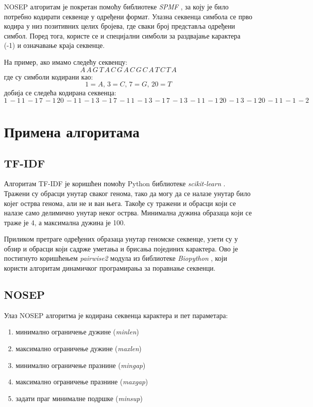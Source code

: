 \documentclass[12pt]{article}
\begin{document}
NOSEP алгоритам је покретан помоћу библиотеке \textit{SPMF} \cite{fournierviger2016spmf}, за коју је било потребно кодирати секвенце у одређени формат. Улазна секвенца симбола се прво кодира у низ позитивних целих бројева, где сваки број представља одређени симбол. Поред тога, користе се и специјални симболи за раздвајање карактера (-1) и означавање краја секвенце.

На пример, ако имамо следећу секвенцу:
$$ A\,  A\, G\, T\, A\, C\, G\, A\, C\, G\, C\, A\, T\, C\, T\, A  $$
где су симболи кодирани као:
$$ 1 = A,\, 3 = C,\, 7 = G,\, 20 = T $$
добија се следећа кодирана секвенца:
$$ 1\, -1\, 1\, -1\, 7\, -1\, 20\, -1\, 1\, -1\, 3\, -1\, 7\, -1\, 1\, -1\, 3\, -1\, 7\, -1\, 3\, -1\, 1\, -1\, 20\, -1\, 3\, -1\, 20\, -1\, 1\, -1\, -2\, $$


\section{Примена алгоритама}

\subsection{TF-IDF}
Алгоритам TF-IDF је коришћен помоћу Python библиотеке \textit{scikit-learn} \cite{scikit-learn}. Тражени су обрасци унутар сваког генома, тако да могу да се налазе унутар било којег острва генома, али не и ван њега. Такође су тражени и обрасци који се налазе само делимично унутар неког острва. Минимална дужина образаца који се траже је 4, а максимална дужина је 100.

Приликом претраге одређених образаца унутар геномске секвенце, узети су у обзир и обрасци који садрже уметања и брисања појединих карактера. Ово је постигнуто коришћењем \textit{pairwise2} модула из библиотеке \textit{Biopython} \cite{cock2009biopython}, који користи алгоритам динамичког програмирања за поравнање секвенци.

\subsection{NOSEP}

Улаз NOSEP алгоритма је кодирана секвенца карактера и пет параметара:
\begin{enumerate}
 \item минимално ограничење дужине (\textit{minlen})
 \item максимално ограничење дужине (\textit{maxlen})
 \item минимално ограничење празнине (\textit{mingap})
 \item максимално ограничење празнине (\textit{maxgap})
 \item задати праг минималне подршке (\textit{minsup})\\
\end{enumerate}
\end{document}
